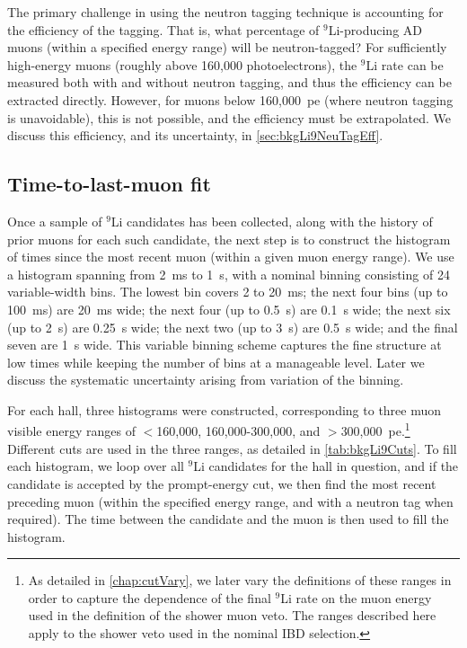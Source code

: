 \documentclass[../thesis.tex]{subfiles}
\begin{document}
The primary challenge in using the neutron tagging technique is accounting for the efficiency of the tagging. That is, what percentage of $^9$Li-producing AD muons (within a specified energy range) will be neutron-tagged? For sufficiently high-energy muons (roughly above 160,000 photoelectrons), the $^9$Li rate can be measured both with and without neutron tagging, and thus the efficiency can be extracted directly. However, for muons below 160,000~pe (where neutron tagging is unavoidable), this is not possible, and the efficiency must be extrapolated. We discuss this efficiency, and its uncertainty, in \autoref{sec:bkgLi9NeuTagEff}.

\subsection{Time-to-last-muon fit}
\label{sec:bkgLi9HistoFit}

Once a sample of $^9$Li candidates has been collected, along with the history of prior muons for each such candidate, the next step is to construct the histogram of times since the most recent muon (within a given muon energy range). We use a histogram spanning from 2~ms to 1~s, with a nominal binning consisting of 24 variable-width bins. The lowest bin covers 2 to 20~ms; the next four bins (up to 100~ms) are 20~ms wide; the next four (up to 0.5~s) are 0.1~s wide; the next six (up to 2~s) are 0.25~s wide; the next two (up to 3~s) are 0.5~s wide; and the final seven are 1~s wide. This variable binning scheme captures the fine structure at low times while keeping the number of bins at a manageable level. Later we discuss the systematic uncertainty arising from variation of the binning.

For each hall, three histograms were constructed, corresponding to three muon visible energy ranges of $<$160,000, 160,000-300,000, and $>$300,000~pe.\footnote{As detailed in \autoref{chap:cutVary}, we later vary the definitions of these ranges in order to capture the dependence of the final $^9$Li rate on the muon energy used in the definition of the shower muon veto. The ranges described here apply to the shower veto used in the nominal IBD selection.} Different cuts are used in the three ranges, as detailed in \autoref{tab:bkgLi9Cuts}. To fill each histogram, we loop over all $^9$Li candidates for the hall in question, and if the candidate is accepted by the prompt-energy cut, we then find the most recent preceding muon (within the specified energy range, and with a neutron tag when required). The time between the candidate and the muon is then used to fill the histogram.
\end{document}

